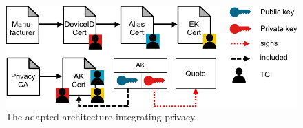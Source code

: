 \begin{figure}[htb]
  \centering
  \includegraphics[width=1\linewidth]{figures/privacy-arch.pdf}
  \caption{The adapted architecture integrating privacy.}\label{fig:privacy_arch}
\end{figure}
